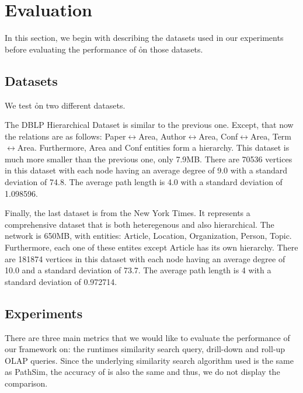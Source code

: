 \section{Evaluation}
\label{sec:eval}

In this section, we begin with describing the datasets used in our experiments
before evaluating the performance of \h on those datasets.

\subsection{Datasets}

We test \h on two different datasets.


The DBLP Hierarchical Dataset is similar to the previous one. Except, that now
the relations are as follows: Paper$\leftrightarrow$Area,
Author$\leftrightarrow$Area, Conf$\leftrightarrow$Area,
Term$\leftrightarrow$Area.  Furthermore, Area and Conf entities form a
hierarchy.  This dataset is much more smaller than the previous one, only
7.9MB. There are 70536 vertices in this dataset with each node having
an average degree of 9.0 with a standard deviation of 74.8. The average
path length is 4.0 with a standard deviation of 1.098596.

Finally, the last dataset is from the New York Times. It represents a
comprehensive dataset that is both heteregenous and also hierarchical. The
network is 650MB, with entities: Article, Location, Organization, Person,
Topic. Furthermore, each one of these entites except Article has its own
hierarchy. There are 181874 vertices in this dataset with each node having an
average degree of 10.0 and a standard deviation of 73.7. The average path length
is 4 with a standard deviation of 0.972714.

\subsection {Experiments}

There are three main metrics that we would like to evaluate the performance of
our \h framework on: the runtimes similarity search query, drill-down and
roll-up OLAP queries. Since the underlying similarity search algorithm used is
the same as PathSim, the accuracy of \h is also the same and thus, we do not
display the comparison.

